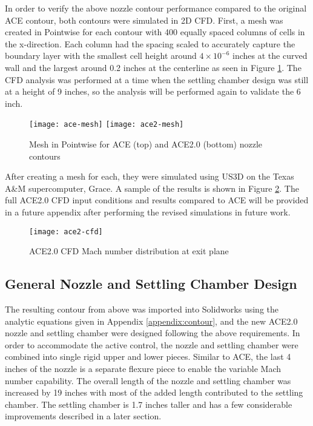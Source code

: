 In order to verify the above nozzle contour performance compared to the original ACE contour, both contours were simulated in 2D CFD. First, a mesh was created in Pointwise for each contour with 400 equally spaced columns of cells in the x-direction. Each column had the spacing scaled to accurately capture the boundary layer with the smallest cell height around $4 \times 10^{-6}$ inches at the curved wall and the largest around 0.2 inches at the centerline as seen in Figure \ref{fig:mesh}. The CFD analysis was performed at a time when the settling chamber design was still at a height of 9 inches, so the analysis will be performed again to validate the 6 inch.

\begin{figure}[ht!]
    \centering
    \texttt{[image: ace-mesh]}
    \texttt{[image: ace2-mesh]}
    \caption{Mesh in Pointwise for ACE (top) and ACE2.0 (bottom) nozzle contours}
    \label{fig:mesh}
\end{figure}

After creating a mesh for each, they were simulated using US3D on the Texas A\&M supercomputer, Grace. A sample of the results is shown in Figure \ref{fig:ace2-cfd}. The full ACE2.0 CFD input conditions and results compared to ACE will be provided in a future appendix after performing the revised simulations in future work.


\begin{figure}[ht!]
    \centering
    \texttt{[image: ace2-cfd]}
    \caption{ACE2.0 CFD Mach number distribution at exit plane}
    \label{fig:ace2-cfd}
\end{figure}

\subsection{General Nozzle and Settling Chamber Design}

The resulting contour from above was imported into Solidworks using the analytic equations given in Appendix \ref{appendix:contour}, and the new ACE2.0 nozzle and settling chamber were designed following the above requirements. In order to accommodate the active control, the nozzle and settling chamber were combined into single rigid upper and lower pieces. Similar to ACE, the last 4 inches of the nozzle is a separate flexure piece to enable the variable Mach number capability. The overall length of the nozzle and settling chamber was increased by 19 inches with most of the added length contributed to the settling chamber. The settling chamber is 1.7 inches taller and has a few considerable improvements described in a later section. 

